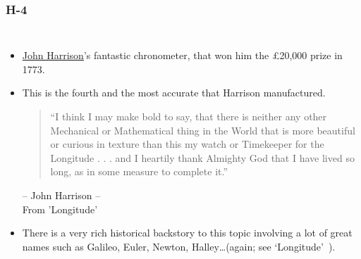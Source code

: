 \begin{frame}
\frametitle{H-4}
\begin{columns}
\begin{itemize}
\item \href{http://en.wikipedia.org/wiki/John_Harrison}{John Harrison}'s fantastic chronometer, that won him the \pounds20,000 prize in 1773.
%
\item This is the fourth and the most accurate that Harrison manufactured.

{\small
\begin{flushleft}
\begin{quotation}
``I think I may make bold to say, that there is neither any other Mechanical or Mathematical thing in the World that is more beautiful or curious in texture than this my watch or Timekeeper for the Longitude . . . and I heartily thank Almighty God that I have lived so long, as in some measure to complete it.''
\end{quotation}
\end{flushleft}
\begin{flushright}
-- John Harrison -- \\
From 'Longitude'~\cite{Sobel1995}
\end{flushright}
}
%
\item There is a very rich historical backstory to this topic involving a lot of great names such as Galileo, Euler, Newton, Halley\ldots (again; see `Longitude'~\cite{Sobel1995}).
\end{itemize}
\end{columns}
\end{frame}

